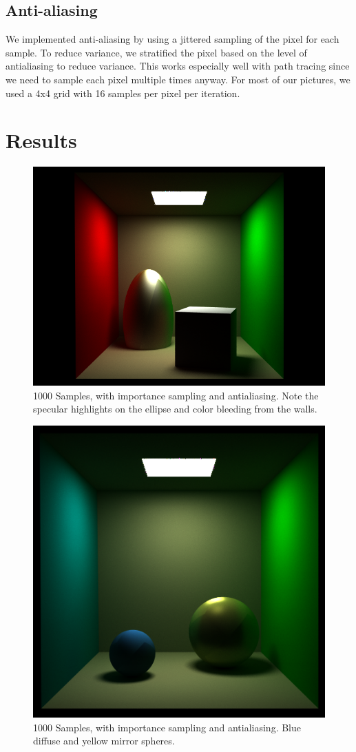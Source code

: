 \documentclass[11pt]{article}
\begin{document}
\subsection{Anti-aliasing}

We implemented anti-aliasing by using a jittered sampling of the pixel for each sample. To reduce variance, we stratified the pixel based on the level of antialiasing to reduce variance. This works especially well with path tracing since we need to sample each pixel multiple times anyway. For most of our pictures, we used a 4x4 grid with 16 samples per pixel per iteration. 

\section{Results}

\begin{figure}
	\begin{center}
		\includegraphics[width=.5\linewidth]{figs/specular_ellipse_1000samples}
		\caption{1000 Samples, with importance sampling and antialiasing. Note the specular highlights
		on the ellipse and color bleeding from the walls.}
	\end{center}
\end{figure}
\begin{figure}
	\begin{center}
		\includegraphics[width=.5\linewidth]{figs/2spheres_1000samples}
		\caption{1000 Samples, with importance sampling and antialiasing. Blue diffuse and yellow mirror spheres.}
	\end{center}
\end{figure}
\end{document}
